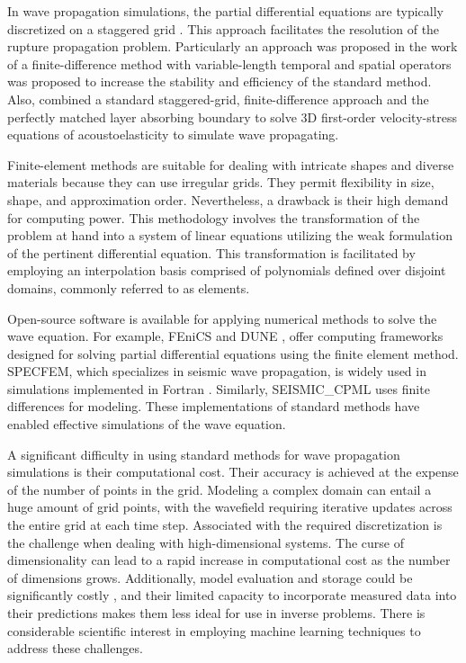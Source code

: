 \documentclass[11pt,twoside]{article}
\begin{document}
In wave propagation simulations, the partial differential equations are typically discretized on a staggered grid 
\citep{madariaga_dynamics_1976,Virieux1986}. This approach facilitates the resolution of the rupture propagation 
problem. Particularly an approach was proposed in the work of  a finite-difference method 
with variable-length temporal and spatial operators was proposed to increase the stability and efficiency of the 
standard method. Also,  combined a standard staggered-grid, finite-difference 
approach and the perfectly matched layer absorbing boundary to solve 3D first-order velocity-stress equations of 
acoustoelasticity to simulate wave propagating.

Finite-element methods are suitable for dealing with intricate shapes and diverse materials because they can use 
irregular grids. They permit flexibility in size, shape, and approximation order. Nevertheless, a drawback is their 
high demand for computing power. This methodology involves the transformation of the problem at hand into a system 
of linear equations utilizing the weak formulation of the pertinent differential equation. This transformation is 
facilitated by employing an interpolation basis comprised of polynomials defined over disjoint domains, commonly 
referred to as elements.

Open-source software is available for applying numerical methods to solve the wave equation. For example, FEniCS 
and DUNE \citep{FEniCS,sander_dune_2020}, offer computing frameworks designed for solving partial differential 
equations using the finite element method. SPECFEM, which specializes in seismic wave propagation, is widely used 
in simulations implemented in Fortran \citep{dimitri_komatitsch_2023_10415228,komatitsch_2024_10823181}. Similarly, 
SEISMIC\_CPML \citep{komatitsch_unsplit_2007} uses finite differences for modeling. These implementations of 
standard methods have enabled effective simulations of the wave equation.

A significant difficulty in using standard methods for wave propagation simulations is their computational cost. Their 
accuracy is achieved at the expense of the number of points in the grid. Modeling a complex domain can entail a huge 
amount of grid points, with the wavefield requiring iterative updates across the entire grid at each time step. 
Associated with the required discretization is the challenge when dealing with high-dimensional systems. The curse 
of dimensionality can lead to a rapid increase in computational cost as the number of dimensions grows. Additionally, 
model evaluation and storage could be significantly costly \citep{saloma_computational_1993}, and their 
limited capacity to incorporate measured data into their predictions makes them less ideal for use in inverse problems. 
There is considerable scientific interest in employing machine learning techniques to address these challenges.
\end{document}
